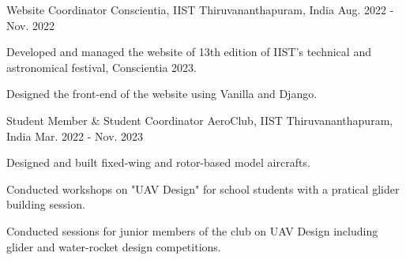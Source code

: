 \begin{cventries}
  \cventry
  {Website Coordinator} %
  {Conscientia, IIST} %
  {Thiruvananthapuram, India} %
  {Aug. 2022 - Nov. 2022} %
  {
    \begin{cvitems} %
      \item {Developed and managed the website of 13th edition of IIST's technical and astronomical festival, Conscientia 2023.}
      \item {Designed the front-end of the website using Vanilla and Django.}
    \end{cvitems}
  }

  \cventry
  {Student Member \& Student Coordinator} %
  {AeroClub, IIST} %
  {Thiruvananthapuram, India} %
  {Mar. 2022 - Nov. 2023} %
  {
    \begin{cvitems} %
      \item {Designed and built fixed-wing and rotor-based model aircrafts.}
      \item {Conducted workshops on "UAV Design" for school students with a pratical glider building session.}
      \item {Conducted sessions for junior members of the club on UAV Design including glider and water-rocket design competitions.}
    \end{cvitems}
  }

\end{cventries}
